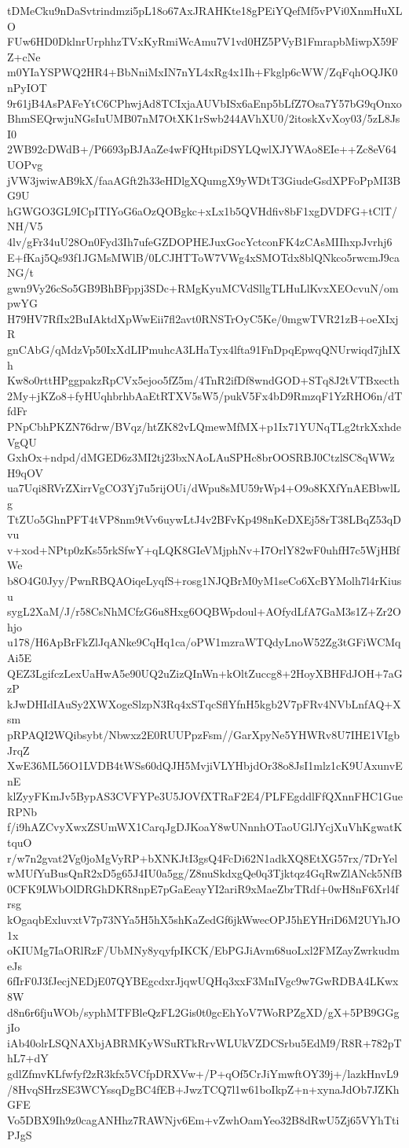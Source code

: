 tDMeCku9nDaSvtrindmzi5pL18o67AxJRAHKte18gPEiYQefMf5vPVi0XnmHuXLO
FUw6HD0DklnrUrphhzTVxKyRmiWcAmu7V1vd0HZ5PVyB1FmrapbMiwpX59FZ+cNe
m0YIaYSPWQ2HR4+BbNniMxIN7nYL4xRg4x1Ih+Fkglp6cWW/ZqFqhOQJK0nPyIOT
9r61jB4AsPAFeYtC6CPhwjAd8TCIxjaAUVbISx6aEnp5bLfZ7Osa7Y57bG9qOnxo
BhmSEQrwjuNGsIuUMB07nM7OtXK1rSwb244AVhXU0/2itoskXvXoy03/5zL8JsI0
2WB92cDWdB+/P6693pBJAaZe4wFfQHtpiDSYLQwlXJYWAo8EIe++Zc8eV64UOPvg
jVW3jwiwAB9kX/faaAGft2h33eHDlgXQumgX9yWDtT3GiudeGsdXPFoPpMI3BG9U
hGWGO3GL9ICpITIYoG6aOzQOBgkc+xLx1b5QVHdfiv8bF1xgDVDFG+tClT/NH/V5
4lv/gFr34uU28On0Fyd3Ih7ufeGZDOPHEJuxGocYctconFK4zCAsMIIhxpJvrhj6
E+fKaj5Qs93f1JGMsMWlB/0LCJHTToW7VWg4xSMOTdx8blQNkco5rwcmJ9caNG/t
gwn9Vy26cSo5GB9BhBFppj3SDc+RMgKyuMCVdSllgTLHuLlKvxXEOcvuN/ompwYG
H79HV7RfIx2BuIAktdXpWwEii7fl2avt0RNSTrOyC5Ke/0mgwTVR21zB+oeXIxjR
gnCAbG/qMdzVp50IxXdLIPmuhcA3LHaTyx4lfta91FnDpqEpwqQNUrwiqd7jhIXh
Kw8o0rttHPggpakzRpCVx5ejoo5fZ5m/4TnR2ifDf8wndGOD+STq8J2tVTBxecth
2My+jKZo8+fyHUqhbrhbAaEtRTXV5sW5/pukV5Fx4bD9RmzqF1YzRHO6n/dTfdFr
PNpCbhPKZN76drw/BVqz/htZK82vLQmewMfMX+p1Ix71YUNqTLg2trkXxhdeVgQU
GxhOx+ndpd/dMGED6z3MI2tj23bxNAoLAuSPHc8brOOSRBJ0CtzlSC8qWWzH9qOV
ua7Uqi8RVrZXirrVgCO3Yj7u5rijOUi/dWpu8sMU59rWp4+O9o8KXfYnAEBbwlLg
TtZUo5GhnPFT4tVP8nm9tVv6uywLtJ4v2BFvKp498nKeDXEj58rT38LBqZ53qDvu
v+xod+NPtp0zKs55rkSfwY+qLQK8GIeVMjphNv+I7OrlY82wF0uhfH7c5WjHBfWe
b8O4G0Jyy/PwnRBQAOiqeLyqfS+rosg1NJQBrM0yM1seCo6XcBYMolh7l4rKiusu
sygL2XaM/J/r58CsNhMCfzG6u8Hxg6OQBWpdoul+AOfydLfA7GaM3s1Z+Zr2Ohjo
u178/H6ApBrFkZlJqANke9CqHq1ca/oPW1mzraWTQdyLnoW52Zg3tGFiWCMqAi5E
QEZ3LgifczLexUaHwA5e90UQ2uZizQInWn+kOltZuccg8+2HoyXBHFdJOH+7aGzP
kJwDHIdIAuSy2XWXogeSlzpN3Rq4xSTqcSflYfnH5kgb2V7pFRv4NVbLnfAQ+Xsm
pRPAQI2WQibsybt/Nbwxz2E0RUUPpzFsm//GarXpyNe5YHWRv8U7IHE1VIgbJrqZ
XwE36ML56O1LVDB4tWSs60dQJH5MvjiVLYHbjdOr38o8JsI1mlz1cK9UAxunvEnE
klZyyFKmJv5BypAS3CVFYPe3U5JOVfXTRaF2E4/PLFEgddlFfQXnnFHC1GueRPNb
f/i9hAZCvyXwxZSUmWX1CarqJgDJKoaY8wUNnnhOTaoUGlJYcjXuVhKgwatKtquO
r/w7n2gvat2Vg0joMgVyRP+bXNKJtI3gsQ4FcDi62N1adkXQ8EtXG57rx/7DrYel
wMUfYuBusQnR2xD5g65J4IU0a5gg/Z8nuSkdxgQe0q3Tjktqz4GqRwZlANck5NfB
0CFK9LWbOlDRGhDKR8npE7pGaEeayYI2ariR9xMaeZbrTRdf+0wH8nF6Xrl4frsg
kOgaqbExluvxtV7p73NYa5H5hX5shKaZedGf6jkWwecOPJ5hEYHriD6M2UYhJO1x
oKIUMg7IaORlRzF/UbMNy8yqyfpIKCK/EbPGJiAvm68uoLxl2FMZayZwrkudmeJs
6fIrF0J3fJecjNEDjE07QYBEgcdxrJjqwUQHq3xxF3MnIVgc9w7GwRDBA4LKwx8W
d8n6r6fjuWOb/syphMTFBleQzFL2Gis0t0gcEhYoV7WoRPZgXD/gX+5PB9GGgjIo
iAb40olrLSQNAXbjABRMKyWSuRTkRrvWLUkVZDCSrbu5EdM9/R8R+782pThL7+dY
gdlZfmvKLfwfyf2zR3kfx5VCfpDRXVw+/P+qOf5CrJiYmwftOY39j+/lazkHnvL9
/8HvqSHrzSE3WCYssqDgBC4fEB+JwzTCQ7l1w61boIkpZ+n+xynaJdOb7JZKhGFE
Vo5DBX9Ih9z0cagANHhz7RAWNjv6Em+vZwhOamYeo32B8dRwU5Zj65VYhTtiPJgS
